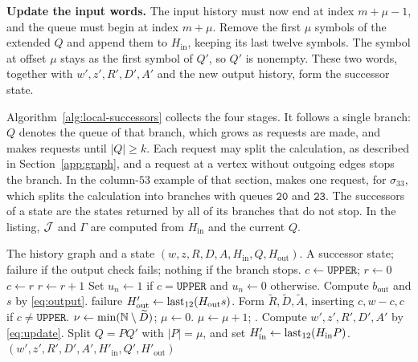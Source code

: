 \medskip\noindent
\textbf{Update the input words.}
The input history must now end at index $m+\mu-1$, and the queue
must begin at index $m+\mu$. Remove the first $\mu$ symbols of the
extended $Q$ and append them to $H_{\mathrm{in}}$, keeping its last
twelve symbols. The symbol at offset $\mu$ stays as the first symbol
of $Q'$, so $Q'$ is nonempty. These two words, together with
$w',z',R',D',A'$ and the new output history, form the successor
state.

\medskip
Algorithm~\ref{alg:local-successors} collects the four stages. It
follows a single branch: $Q$ denotes the queue of that branch, which
grows as requests are made, and  makes requests
until $|Q|\ge k$. Each request may split the calculation, as
described in Section~\ref{app:graph}, and a request at a vertex
without outgoing edges stops the branch. In the column-$53$ example
of that section,  makes one request, for
$\sigma_{33}$, which splits the calculation into branches with queues
$\mathtt{20}$ and $\mathtt{23}$. The successors of a state are the
states returned by all of its branches that do not stop. In the
listing, $\mathcal J$ and $\Gamma$ are computed from $H_{\mathrm{in}}$ and the
current $Q$.

\begin{algorithm}[H]
\caption{One branch of the calculation}
\label{alg:local-successors}
\renewcommand{\algorithmicrequire}{\textbf{Input:}}
\renewcommand{\algorithmicensure}{\textbf{Output:}}
\begin{algorithmic}[1]
\Require The history graph and a state $(w,z,R,D,A,H_{\mathrm{in}},Q,H_{\mathrm{out}})$.
\Ensure A successor state; failure if the output check fails; nothing if the branch stops.
\State {}
\State $c\gets\texttt{UPPER}$; $r\gets0$
    \State {}
      \State $c\gets r$
    \EndIf
  \EndIf
  \State $r\gets r+1$
\EndWhile
\State Set $u_n\gets1$ if $c=\texttt{UPPER}$ and $u_n\gets0$ otherwise.
\State Compute $b_{\mathrm{out}}$ and $s$ by \eqref{eq:output}.
  \State \Return failure
\EndIf
\State $H'_{\mathrm{out}}\gets\operatorname{last}_{12}(H_{\mathrm{out}}s)$.
\State Form $\widetilde R,\widetilde D,\widetilde A$, inserting $c,w-c,c$ if $c\ne\texttt{UPPER}$.
\State $\nu\gets\min(\mathbb N\setminus\widetilde D)$; $\mu\gets0$.
  \State $\mu\gets\mu+1$; .
\EndWhile
\State Compute $w',z',R',D',A'$ by \eqref{eq:update}.
\State Split $Q=PQ'$ with $|P|=\mu$, and set $H'_{\mathrm{in}}\gets\operatorname{last}_{12}(H_{\mathrm{in}}P)$.
\State \Return $(w',z',R',D',A',H'_{\mathrm{in}},Q',H'_{\mathrm{out}})$
\end{algorithmic}
\end{algorithm}

